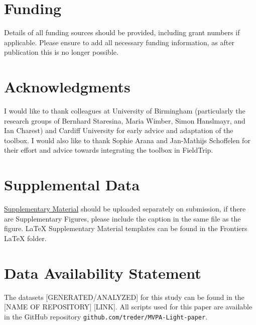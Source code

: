 \documentclass[utf8]{frontiersSCNS} %
\begin{document}
\section*{Funding}
Details of all funding sources should be provided, including grant numbers if applicable. Please ensure to add all necessary funding information, as after publication this is no longer possible.

\section*{Acknowledgments}
I would like to thank colleagues at University of Birmingham (particularly the research groups of Bernhard Staresina, Maria Wimber, Simon Hanslmayr, and Ian Charest) and Cardiff University for early advice and adaptation of the toolbox. 
I would also like to thank Sophie Arana and Jan-Mathijs Schoffelen for their effort and advice towards integrating the toolbox in FieldTrip.

\section*{Supplemental Data}
 \href{http://home.frontiersin.org/about/author-guidelines#SupplementaryMaterial}{Supplementary Material} should be uploaded separately on submission, if there are Supplementary Figures, please include the caption in the same file as the figure. LaTeX Supplementary Material templates can be found in the Frontiers LaTeX folder.

\section*{Data Availability Statement}
The datasets [GENERATED/ANALYZED] for this study can be found in the [NAME OF REPOSITORY] [LINK]. All scripts used for this paper are available in the GitHub repository \texttt{github.com/treder/MVPA-Light-paper}.



\end{document}
